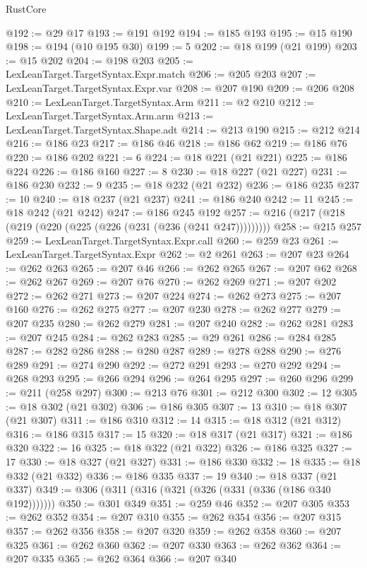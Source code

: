 \begin{lexlean}{RustCore}
\begin{coremodule}
@192 := @29 @17
@193 := @191 @192
@194 := @185 @193
@195 := @15 @190
@198 := @194 (@10 @195 @30)
@199 := 5
@202 := @18 @199 (@21 @199)
@203 := @15 @202
@204 := @198 @203
@205 := LexLeanTarget.TargetSyntax.Expr.match
@206 := @205 @203
@207 := LexLeanTarget.TargetSyntax.Expr.var
@208 := @207 @190
@209 := @206 @208
@210 := LexLeanTarget.TargetSyntax.Arm
@211 := @2 @210
@212 := LexLeanTarget.TargetSyntax.Arm.arm
@213 := LexLeanTarget.TargetSyntax.Shape.adt
@214 := @213 @190
@215 := @212 @214
@216 := @186 @23
@217 := @186 @46
@218 := @186 @62
@219 := @186 @76
@220 := @186 @202
@221 := 6
@224 := @18 @221 (@21 @221)
@225 := @186 @224
@226 := @186 @160
@227 := 8
@230 := @18 @227 (@21 @227)
@231 := @186 @230
@232 := 9
@235 := @18 @232 (@21 @232)
@236 := @186 @235
@237 := 10
@240 := @18 @237 (@21 @237)
@241 := @186 @240
@242 := 11
@245 := @18 @242 (@21 @242)
@247 := @186 @245 @192
@257 := @216 (@217 (@218 (@219 (@220 (@225 (@226 (@231 (@236 (@241 @247)))))))))
@258 := @215 @257
@259 := LexLeanTarget.TargetSyntax.Expr.call
@260 := @259 @23
@261 := LexLeanTarget.TargetSyntax.Expr
@262 := @2 @261
@263 := @207 @23
@264 := @262 @263
@265 := @207 @46
@266 := @262 @265
@267 := @207 @62
@268 := @262 @267
@269 := @207 @76
@270 := @262 @269
@271 := @207 @202
@272 := @262 @271
@273 := @207 @224
@274 := @262 @273
@275 := @207 @160
@276 := @262 @275
@277 := @207 @230
@278 := @262 @277
@279 := @207 @235
@280 := @262 @279
@281 := @207 @240
@282 := @262 @281
@283 := @207 @245
@284 := @262 @283
@285 := @29 @261
@286 := @284 @285
@287 := @282 @286
@288 := @280 @287
@289 := @278 @288
@290 := @276 @289
@291 := @274 @290
@292 := @272 @291
@293 := @270 @292
@294 := @268 @293
@295 := @266 @294
@296 := @264 @295
@297 := @260 @296
@299 := @211 (@258 @297)
@300 := @213 @76
@301 := @212 @300
@302 := 12
@305 := @18 @302 (@21 @302)
@306 := @186 @305
@307 := 13
@310 := @18 @307 (@21 @307)
@311 := @186 @310
@312 := 14
@315 := @18 @312 (@21 @312)
@316 := @186 @315
@317 := 15
@320 := @18 @317 (@21 @317)
@321 := @186 @320
@322 := 16
@325 := @18 @322 (@21 @322)
@326 := @186 @325
@327 := 17
@330 := @18 @327 (@21 @327)
@331 := @186 @330
@332 := 18
@335 := @18 @332 (@21 @332)
@336 := @186 @335
@337 := 19
@340 := @18 @337 (@21 @337)
@349 := @306 (@311 (@316 (@321 (@326 (@331 (@336 (@186 @340 @192)))))))
@350 := @301 @349
@351 := @259 @46
@352 := @207 @305
@353 := @262 @352
@354 := @207 @310
@355 := @262 @354
@356 := @207 @315
@357 := @262 @356
@358 := @207 @320
@359 := @262 @358
@360 := @207 @325
@361 := @262 @360
@362 := @207 @330
@363 := @262 @362
@364 := @207 @335
@365 := @262 @364
@366 := @207 @340

\end{coremodule}
\end{lexlean}
